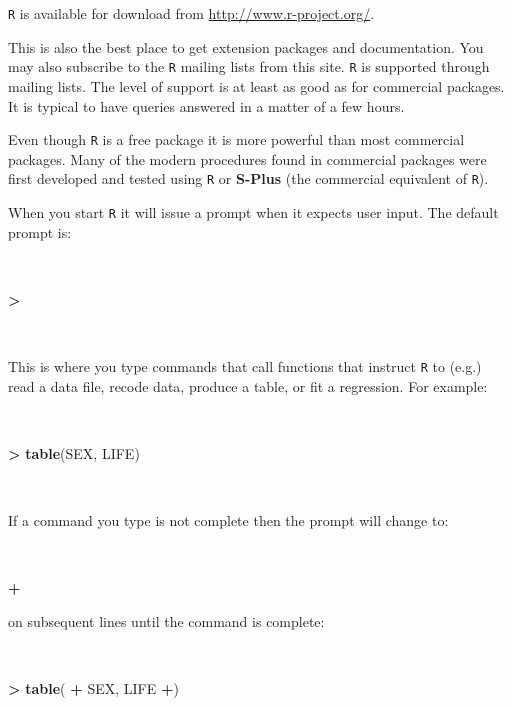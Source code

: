\documentclass[12pt,a4paper]{book}
\newenvironment{Shaded}{\begin{snugshade}}{\end{snugshade}}
\newcommand{\KeywordTok}[1]{\textcolor[rgb]{0.13,0.29,0.53}{\textbf{#1}}}
\newcommand{\StringTok}[1]{\textcolor[rgb]{0.31,0.60,0.02}{#1}}
\newcommand{\OperatorTok}[1]{\textcolor[rgb]{0.81,0.36,0.00}{\textbf{#1}}}
\newcommand{\NormalTok}[1]{#1}
\theoremstyle{definition}
\theoremstyle{definition}
\theoremstyle{definition}
\theoremstyle{remark}
\begin{document}
\texttt{R} is available for download from
\url{http://www.r-project.org/}.

This is also the best place to get extension packages and documentation.
You may also subscribe to the \texttt{R} mailing lists from this site.
\texttt{R} is supported through mailing lists. The level of support is
at least as good as for commercial packages. It is typical to have
queries answered in a matter of a few hours.

Even though \texttt{R} is a free package it is more powerful than most
commercial packages. Many of the modern procedures found in commercial
packages were first developed and tested using \texttt{R} or
\textbf{S-Plus} (the commercial equivalent of \texttt{R}).

When you start \texttt{R} it will issue a prompt when it expects user
input. The default prompt is:

~

\begin{Shaded}
\begin{Highlighting}[]
\OperatorTok{>}
\end{Highlighting}
\end{Shaded}

~

This is where you type commands that call functions that instruct
\texttt{R} to (e.g.) read a data file, recode data, produce a table, or
fit a regression. For example:

~

\begin{Shaded}
\begin{Highlighting}[]
\OperatorTok{>}\StringTok{ }\KeywordTok{table}\NormalTok{(SEX, LIFE)}
\end{Highlighting}
\end{Shaded}

~

If a command you type is not complete then the prompt will change to:

~

\begin{Shaded}
\begin{Highlighting}[]
\OperatorTok{+}
\end{Highlighting}
\end{Shaded}

\newpage

on subsequent lines until the command is complete:

~

\begin{Shaded}
\begin{Highlighting}[]
\OperatorTok{>}\StringTok{ }\KeywordTok{table}\NormalTok{(}
\OperatorTok{+}\StringTok{ }\NormalTok{SEX, LIFE }\OperatorTok{+}\NormalTok{)}
\end{Highlighting}
\end{Shaded}
\end{document}
